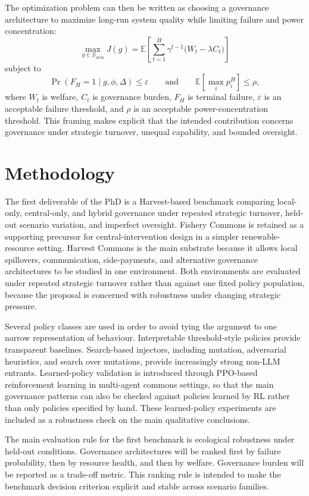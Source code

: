\documentclass[10pt]{article}
\begin{document}
The optimization problem can then be written as choosing a governance architecture to maximize long-run system quality while limiting failure and power concentration:
\[
\max_{g \in \mathcal{G}_{\text{arch}}} J(g)
=
\mathbb{E}\!\left[\sum_{t=1}^{H}\gamma^{t-1}\bigl(W_t-\lambda C_t\bigr)\right]
\]
subject to
\[
\Pr(F_H=1\mid g,\phi,\Delta)\le \varepsilon
\qquad\text{and}\qquad
\mathbb{E}\!\left[\max_i p_i^H\right]\le \rho,
\]
where $W_t$ is welfare, $C_t$ is governance burden, $F_H$ is terminal failure, $\varepsilon$ is an acceptable failure threshold, and $\rho$ is an acceptable power-concentration threshold. This framing makes explicit that the intended contribution concerns governance under strategic turnover, unequal capability, and bounded oversight.

\section{Methodology}

The first deliverable of the PhD is a Harvest-based benchmark comparing local-only, central-only, and hybrid governance under repeated strategic turnover, held-out scenario variation, and imperfect oversight. Fishery Commons is retained as a supporting precursor for central-intervention design in a simpler renewable-resource setting. Harvest Commons is the main substrate because it allows local spillovers, communication, side-payments, and alternative governance architectures to be studied in one environment. Both environments are evaluated under repeated strategic turnover rather than against one fixed policy population, because the proposal is concerned with robustness under changing strategic pressure.

Several policy classes are used in order to avoid tying the argument to one narrow representation of behaviour. Interpretable threshold-style policies provide transparent baselines. Search-based injectors, including mutation, adversarial heuristics, and search over mutations, provide increasingly strong non-LLM entrants. Learned-policy validation is introduced through PPO-based reinforcement learning in multi-agent commons settings, so that the main governance patterns can also be checked against policies learned by RL rather than only policies specified by hand. These learned-policy experiments are included as a robustness check on the main qualitative conclusions.

The main evaluation rule for the first benchmark is ecological robustness under held-out conditions. Governance architectures will be ranked first by failure probability, then by resource health, and then by welfare. Governance burden will be reported as a trade-off metric. This ranking rule is intended to make the benchmark decision criterion explicit and stable across scenario families.
\end{document}

